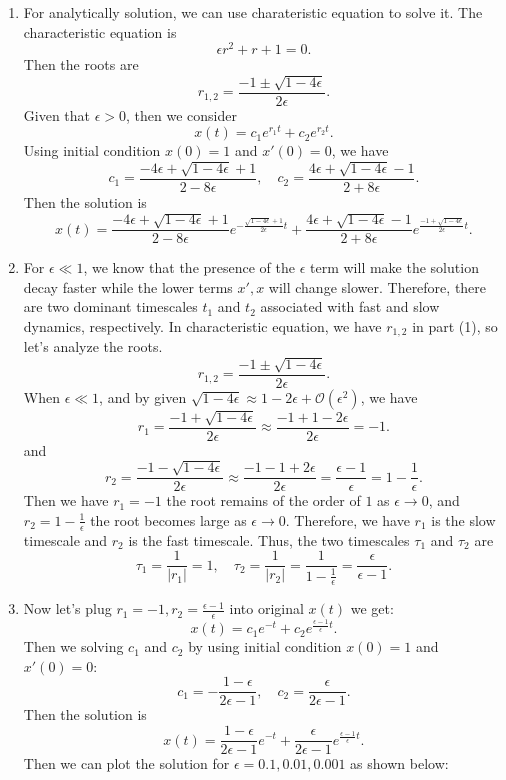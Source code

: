 \documentclass[12pt]{exam}
\newcommand{\BO}{\mathcal{O}}
\begin{document}
\begin{enumerate}
	\item For analytically solution, we can use charateristic equation to solve it. The characteristic equation is
		\[\epsilon r^2+r+1=0.\]
		Then the roots are
		\[r_{1,2}=\frac{-1\pm\sqrt{1-4\epsilon}}{2\epsilon}.\]
		Given that $\epsilon>0$, then we consider
		\[x(t)= c_1e^{r_1t}+c_2e^{r_2t}.\]
		Using initial condition $x(0)=1$ and $x'(0)=0$, we have
		\[c_1 = \frac{-4\epsilon+\sqrt{1-4\epsilon}+1}{2-8\epsilon}, \quad c_2 = \frac{4\epsilon+\sqrt{1-4\epsilon}-1}{2+8\epsilon}.\]
		Then the solution is
		\[x(t)=\frac{-4\epsilon+\sqrt{1-4\epsilon}+1}{2-8\epsilon}e^{-\frac{\sqrt{1-4\epsilon }+1}{2\epsilon}t}+\frac{4\epsilon+\sqrt{1-4\epsilon}-1}{2+8\epsilon}e^{\frac{-1+\sqrt{1-4\epsilon}}{2\epsilon} t}.\]

	\item For $\epsilon \ll 1$, we know that the presence of the $\epsilon$ term will make the solution decay faster while the lower terms $x', x$ will change slower. Therefore, there are two dominant timescales $t_1$ and $t_2$ associated with fast and slow dynamics, respectively.
		In characteristic equation, we have $r_{1,2}$ in part (1), so let's analyze the roots.
		\[r_{1,2}=\frac{-1\pm\sqrt{1-4\epsilon}}{2\epsilon}.\]
		When $\epsilon \ll 1$, and by given $\sqrt{1-4\epsilon}\approx 1-2\epsilon+\BO(\epsilon^2)$, we have
		\[r_1= \frac{-1+\sqrt{1-4\epsilon}}{2\epsilon} \approx \frac{-1+1-2\epsilon}{2\epsilon} = -1.\]
		and
		\[r_2= \frac{-1-\sqrt{1-4\epsilon}}{2\epsilon} \approx \frac{-1-1+2\epsilon}{2\epsilon} = \frac{\epsilon-1}{\epsilon} = 1-\frac{1}{\epsilon}.\]
		Then we have $r_1=-1$ the root remains of the order of $1$ as $\epsilon \to 0$, and $r_2=1-\frac{1}{\epsilon}$ the root becomes large as $\epsilon \to 0$. Therefore, we have $r_1$ is the slow timescale and $r_2$ is the fast timescale.
		Thus, the two timescales $\tau_1$ and $\tau_2$ are
		\[\tau_1 = \frac{1}{|r_1|} = 1, \quad \tau_2 = \frac{1}{|r_2|} = \frac{1}{1-\frac{1}{\epsilon}} = \frac{\epsilon}{\epsilon-1}.\]
		
	\item Now let's plug $r_1=-1, r_2=\frac{\epsilon-1}{\epsilon}$ into original $x(t)$ we get:
		\[x(t)= c_1e^{-t}+c_2e^{\frac{\epsilon-1}{\epsilon} t}.\]
		Then we solving $c_1$ and $c_2$ by using initial condition $x(0)=1$ and $x'(0)=0$:
		\[c_1 = -\frac{1-\epsilon}{2\epsilon-1}, \quad c_2 = \frac{\epsilon}{2\epsilon-1}.\]
		Then the solution is
		\[x(t)=\frac{1-\epsilon}{2\epsilon-1}e^{-t}+\frac{\epsilon}{2\epsilon-1}e^{\frac{\epsilon-1}{\epsilon} t}.\]
		Then we can plot the solution for $\epsilon=0.1, 0.01, 0.001$ as shown below:




\end{enumerate}
\end{document}
